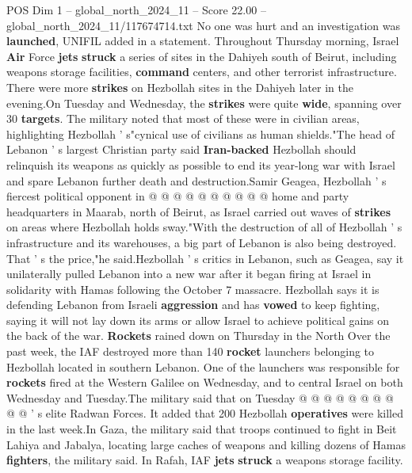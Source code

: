 \begin{textsample}{POS Dim 1 – global\_north\_2024\_11 – Score 22.00 – global\_north\_2024\_11/117674714.txt}
No one was hurt and an investigation was \textbf{launched}, UNIFIL added in a statement.
Throughout Thursday morning, Israel \textbf{Air} Force \textbf{jets} \textbf{struck} a series of sites in the Dahiyeh south of Beirut, including weapons storage facilities, \textbf{command} centers, and other terrorist infrastructure.
There were more \textbf{strikes} on Hezbollah sites in the Dahiyeh later in the evening.On Tuesday and Wednesday, the \textbf{strikes} were quite \textbf{wide}, spanning over 30 \textbf{targets}.
The military noted that most of these were in civilian areas, highlighting Hezbollah ' s"cynical use of civilians as human shields."The head of Lebanon ' s largest Christian party said \textbf{Iran-backed} Hezbollah should relinquish its weapons as quickly as possible to end its year-long war with Israel and spare Lebanon further death and destruction.Samir Geagea, Hezbollah ' s fiercest political opponent in @ @ @ @ @ @ @ @ @ @ home and party headquarters in Maarab, north of Beirut, as Israel carried out waves of \textbf{strikes} on areas where Hezbollah holds sway."With the destruction of all of Hezbollah ' s infrastructure and its warehouses, a big part of Lebanon is also being destroyed.
That ' s the price,"he said.Hezbollah ' s critics in Lebanon, such as Geagea, say it unilaterally pulled Lebanon into a new war after it began firing at Israel in solidarity with Hamas following the October 7 massacre.
Hezbollah says it is defending Lebanon from Israeli \textbf{aggression} and has \textbf{vowed} to keep fighting, saying it will not lay down its arms or allow Israel to achieve political gains on the back of the war. \textbf{Rockets} rained down on Thursday in the North Over the past week, the IAF destroyed more than 140 \textbf{rocket} launchers belonging to Hezbollah located in southern Lebanon.
One of the launchers was responsible for \textbf{rockets} fired at the Western Galilee on Wednesday, and to central Israel on both Wednesday and Tuesday.The military said that on Tuesday @ @ @ @ @ @ @ @ @ @ ' s elite Radwan Forces.
It added that 200 Hezbollah \textbf{operatives} were killed in the last week.In Gaza, the military said that troops continued to fight in Beit Lahiya and Jabalya, locating large caches of weapons and killing dozens of Hamas \textbf{fighters}, the military said.
In Rafah, IAF \textbf{jets} \textbf{struck} a weapons storage facility.

\end{textsample}
